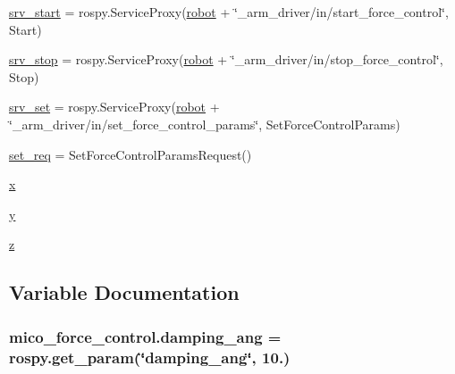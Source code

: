 \begin{DoxyCompactItemize}
\hyperlink{namespacemico__force__control_ad419a15a7ffa6346e96486103e629a03}{srv\+\_\+start} = rospy.\+Service\+Proxy(\hyperlink{namespacemico__force__control_ae3d8428c9fe2a197c78735d5e2bf7d13}{robot} + \char`\"{}\+\_\+arm\+\_\+driver/in/start\+\_\+force\+\_\+control\char`\"{}, Start)
\item 
\hyperlink{namespacemico__force__control_a2cebf1d67600a8e0e30509e127b2ca15}{srv\+\_\+stop} = rospy.\+Service\+Proxy(\hyperlink{namespacemico__force__control_ae3d8428c9fe2a197c78735d5e2bf7d13}{robot} + \char`\"{}\+\_\+arm\+\_\+driver/in/stop\+\_\+force\+\_\+control\char`\"{}, Stop)
\item 
\hyperlink{namespacemico__force__control_aec902d9fa26ad89858657a5c69604244}{srv\+\_\+set} = rospy.\+Service\+Proxy(\hyperlink{namespacemico__force__control_ae3d8428c9fe2a197c78735d5e2bf7d13}{robot} + \char`\"{}\+\_\+arm\+\_\+driver/in/set\+\_\+force\+\_\+control\+\_\+params\char`\"{}, Set\+Force\+Control\+Params)
\item 
\hyperlink{namespacemico__force__control_adaac210d765d56a858099e0da5985634}{set\+\_\+req} = Set\+Force\+Control\+Params\+Request()
\item 
\hyperlink{namespacemico__force__control_aa9fdd2ef1b77ee897f0d602302379821}{x}
\item 
\hyperlink{namespacemico__force__control_a8a0f8c92894b08350a0d164ffac7d643}{y}
\item 
\hyperlink{namespacemico__force__control_a5537f83e86fedd5a78e2bbaab62d326f}{z}
\end{DoxyCompactItemize}


\subsection{Variable Documentation}
\subsubsection[{\texorpdfstring{damping\+\_\+ang}{damping_ang}}]{\setlength{\rightskip}{0pt plus 5cm}mico\+\_\+force\+\_\+control.\+damping\+\_\+ang = rospy.\+get\+\_\+param(\char`\"{}damping\+\_\+ang\char`\"{}, 10.)}\hypertarget{namespacemico__force__control_a92927656a13dc0f41e49ba262d47d74a}{}\label{namespacemico__force__control_a92927656a13dc0f41e49ba262d47d74a}
